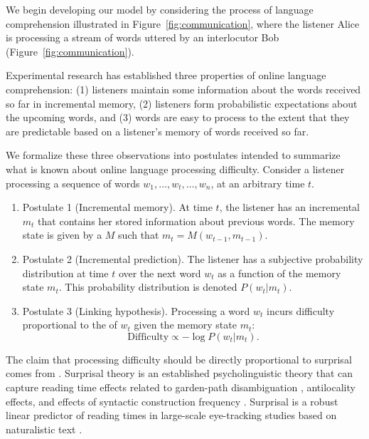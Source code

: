 We begin developing our model by considering the process of language comprehension illustrated in Figure~\ref{fig:communication}, where the listener Alice is processing a stream of words uttered by an interlocutor Bob (Figure~\ref{fig:communication}). 

Experimental research has established three properties of online language comprehension: (1) listeners maintain some information about the words received so far in incremental memory, (2) listeners form probabilistic expectations about the upcoming words, and (3) words are easy to process to the extent that they are predictable based on a listener's memory of words received so far.

We formalize these three observations into postulates intended to summarize what is known about online language processing difficulty. Consider a listener processing a sequence of words $w_1, \dots, w_t, \dots, w_n$, at an arbitrary time $t$.
\begin{enumerate}
    \item Postulate 1 (Incremental memory). At time $t$, the listener has an incremental  $m_t$ that contains her stored information about previous words. The memory state is given by a  $M$ such that $m_t = M(w_{t-1}, m_{t-1})$.
    \item Postulate 2 (Incremental prediction). The listener has a subjective probability distribution at time $t$ over the next word $w_t$ as a function of the memory state $m_t$. This probability distribution is denoted $P(w_t|m_t)$.
    \item Postulate 3 (Linking hypothesis). Processing a word $w_t$ incurs difficulty proportional to the  of $w_t$ given the memory state $m_t$:
    \begin{equation}
    \label{eq:lossy-surp}
    \text{Difficulty} \propto -\log P(w_t | m_t).
\end{equation}
\end{enumerate}
The claim that processing difficulty should be directly proportional to surprisal comes from . Surprisal theory is an established psycholinguistic theory that can capture reading time effects related to garden-path disambiguation \citep{hale2001probabilistic}, antilocality effects, and effects of syntactic construction frequency \citep{levy2008expectation}. Surprisal is a robust linear predictor of reading times in large-scale eye-tracking studies based on naturalistic text \citep{smith-effect-2013,goodkind-predictive-2018}.

